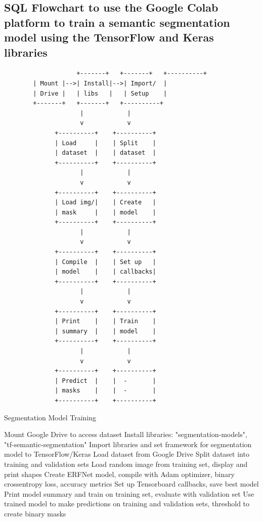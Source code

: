 \documentclass[11pt, a4paper, openany]{book}
\begin{document}
\subsection{SQL Flowchart to use the Google Colab platform to train a semantic segmentation model using the TensorFlow and Keras libraries}
\begin{lstlisting}
                    +-------+   +-------+   +----------+
        | Mount |-->| Install|-->| Import/  |
        | Drive |   | libs   |   | Setup    |
        +-------+   +-------+   +----------+
                     |            |
                     v            v
              +----------+    +----------+
              | Load     |    | Split    |
              | dataset  |    | dataset  |
              +----------+    +----------+
                     |            |
                     v            v
              +----------+    +----------+
              | Load img/|    | Create   |
              | mask     |    | model    |
              +----------+    +----------+
                     |            |
                     v            v
              +----------+    +----------+
              | Compile  |    | Set up   |
              | model    |    | callbacks|
              +----------+    +----------+
                     |            |
                     v            v
              +----------+    +----------+
              | Print    |    | Train    |
              | summary  |    | model    |
              +----------+    +----------+
                     |            |
                     v            v
              +----------+    +----------+
              | Predict  |    |  -       |
              | masks    |    |  -       |
              +----------+    +----------+

\end{lstlisting}

\begin{algorithm}[H]
\caption{Segmentation Model Training}
\label{alg:segmentation_model_training}
\begin{algorithmic}[1]
\State Mount Google Drive to access dataset
\State Install libraries: "segmentation-models", "tf-semantic-segmentation"
\State Import libraries and set framework for segmentation model to TensorFlow/Keras
\State Load dataset from Google Drive
\State Split dataset into training and validation sets
\State Load random image from training set, display and print shapes
\State Create ERFNet model, compile with Adam optimizer, binary crossentropy loss, accuracy metrics
\State Set up Tensorboard callbacks, save best model
\State Print model summary and train on training set, evaluate with validation set
\State Use trained model to make predictions on training and validation sets, threshold to create binary masks
\EndProcedure
\end{algorithmic}
\end{algorithm}
 
\end{document}
